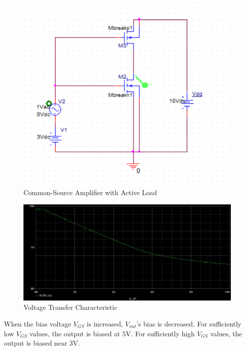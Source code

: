 \FloatBarrier

\begin{figure}[h!]
	\centering
	\includegraphics[scale=0.75]{./images/circuit4.PNG}
	\caption{Common-Source Amplifier with Active Load}
	\label{fig:circuit4}
\end{figure}

\FloatBarrier

\FloatBarrier

\begin{figure}[h!]
	\centering
	\includegraphics[scale=0.50]{./images/dc_sweep.PNG}
	\caption{Voltage Transfer Characteristic}
	\label{fig:dc_sweep}
\end{figure}

\FloatBarrier

When the bias voltage $V_{GS}$ is increased, $V_{out}$'s bias is decreased. For sufficiently low $V_{GS}$ values, the output is biased at $5$\si{\volt}. For sufficiently high $V_{GS}$ values, the output is biased near $3$\si{\volt}.


